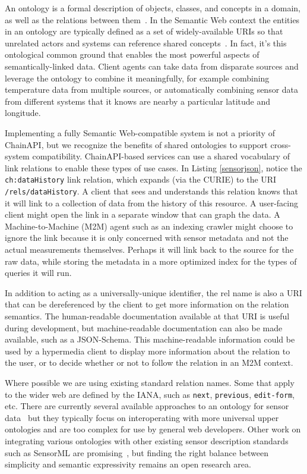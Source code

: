 \documentclass{acm_proc_article-sp}
\begin{document}
An ontology is a formal description of objects, classes, and concepts in a
domain, as well as the relations between them~\cite{gruber1993}. In the
Semantic Web context the entities in an ontology are typically defined as a set
of widely-available URIs so that unrelated actors and systems can reference
shared concepts~\cite{bernerslee2001semantic}. In fact, it's this ontological
common ground that enables the most powerful aspects of semantically-linked
data. Client agents can take data from disparate sources and leverage the
ontology to combine it meaningfully, for example combining temperature data
from multiple sources, or automatically combining sensor data from different
systems that it knows are nearby a particular latitude and longitude.

Implementing a fully Semantic Web-compatible system is not a priority of
ChainAPI, but we recognize the benefits of shared ontologies to support
cross-system compatibility. ChainAPI-based services can use a shared vocabulary
of link relations to enable these types of use cases. In Listing
\ref{sensorjson}, notice the \texttt{ch:dataHistory} link relation, which
expands (via the CURIE) to the URI \texttt{/rels/dataHistory}. A client that
sees and understands this relation knows that it will link to a collection of
data from the history of this resource. A user-facing client might open the
link in a separate window that can graph the data. A Machine-to-Machine (M2M)
agent such as an indexing crawler might choose to ignore the link because it is
only concerned with sensor metadata and not the actual measurements themselves.
Perhaps it will link back to the source for the raw data, while storing the
metadata in a more optimized index for the types of queries it will run.

In addition to acting as a universally-unique identifier, the rel name is also
a URI that can be dereferenced by the client to get more information on the
relation semantics. The human-readable documentation available at that URI is
useful during development, but machine-readable documentation can also be made
available, such as a JSON-Schema. This machine-readable information could be
used by a hypermedia client to display more information about the relation to
the user, or to decide whether or not to follow the relation in an M2M context.

Where possible we are using existing standard relation names. Some that apply
to the wider web are defined by the IANA, such as \texttt{next},
\texttt{previous}, \texttt{edit-form}, etc. There are currently several
available approaches to an ontology for sensor
data~\cite{w3contology}\cite{broring2011}\cite{eid2007} but they typically
focus on interoperating with more universal upper ontologies and are too
complex for use by general web developers. Other work on integrating various
ontologies with other existing sensor description standards such as SensorML
are promising~\cite{russomanno2005}, but finding the right balance between
simplicity and semantic expressivity remains an open research area.
\end{document}
